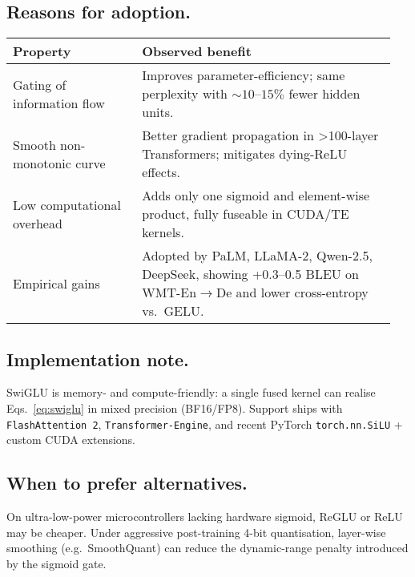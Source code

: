\subsection{Reasons for adoption.}
\vspace{-0.4em}
\begin{center}
\begin{tabular}{@{}p{0.32\linewidth}p{0.63\linewidth}@{}}
\toprule
\textbf{Property} & \textbf{Observed benefit} \\ \midrule
Gating of information flow &
Improves parameter-efficiency; same perplexity with $\sim 10$–$15\%$ fewer hidden units. \\
Smooth non-monotonic curve &
Better gradient propagation in >100-layer Transformers; mitigates dying-ReLU effects. \\
Low computational overhead &
Adds only one sigmoid and element-wise product, fully fuseable in CUDA/TE kernels. \\
Empirical gains &
Adopted by PaLM, LLaMA-2, Qwen-2.5, DeepSeek, showing \mbox{+0.3–0.5} BLEU on WMT-En$\to$De and lower cross-entropy vs.\ GELU. \\ \bottomrule
\end{tabular}
\end{center}

\subsection{Implementation note.}
SwiGLU is memory- and compute-friendly: a single fused kernel can realise
Eqs.~\eqref{eq:swiglu} in mixed precision (BF16/FP8).  
Support ships with \texttt{FlashAttention\,2}, \texttt{Transformer-Engine}, and
recent PyTorch \texttt{torch.\allowbreak nn.\allowbreak SiLU} + custom CUDA extensions.

\subsection{When to prefer alternatives.}
On ultra-low-power microcontrollers lacking hardware sigmoid, ReGLU or ReLU may
be cheaper.  Under aggressive post-training 4-bit quantisation,
layer-wise smoothing (e.g.\ SmoothQuant) can reduce the dynamic-range penalty
introduced by the sigmoid gate.

